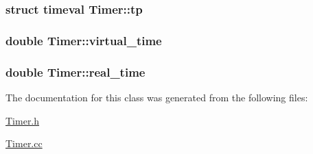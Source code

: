 \hypertarget{classTimer_f9d8a85efc3809ca6223ad60bbda6e5a}{
\subsubsection{\setlength{\rightskip}{0pt plus 5cm}struct timeval {\bf Timer::tp}}}
\label{classTimer_f9d8a85efc3809ca6223ad60bbda6e5a}


\hypertarget{classTimer_1c89ce2e92a2f63cc2309ed9ac765905}{
\subsubsection{\setlength{\rightskip}{0pt plus 5cm}double {\bf Timer::virtual\_\-time}}}
\label{classTimer_1c89ce2e92a2f63cc2309ed9ac765905}


\hypertarget{classTimer_845cc39afdf6c74225d2d5580de49208}{
\subsubsection{\setlength{\rightskip}{0pt plus 5cm}double {\bf Timer::real\_\-time}}}
\label{classTimer_845cc39afdf6c74225d2d5580de49208}




The documentation for this class was generated from the following files:\begin{CompactItemize}
\item 
\hyperlink{Timer_8h}{Timer.h}\item 
\hyperlink{Timer_8cc}{Timer.cc}\end{CompactItemize}
